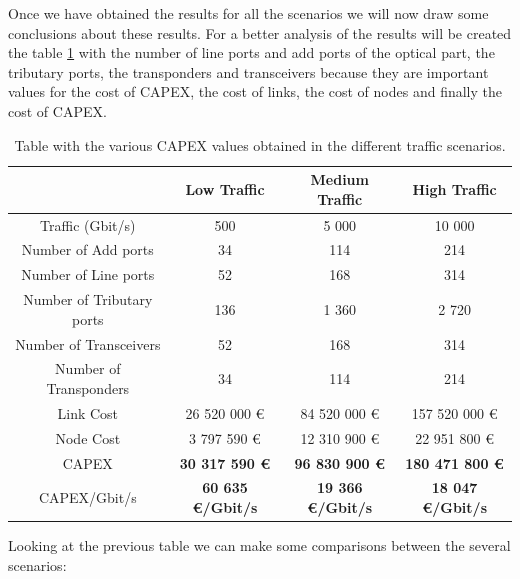 Once we have obtained the results for all the scenarios we will now draw some conclusions about these results. For a better analysis of the results will be created the table \ref{table_comparative_transp_surv} with the number of line ports and add ports of the optical part, the tributary ports, the transponders and transceivers because they are important values for the cost of CAPEX, the cost of links, the cost of nodes and finally the cost of CAPEX.\\

\begin{table}[h!]
\centering
\begin{tabular}{| c | c | c | c |}
 \hline
  & Low Traffic & Medium Traffic  & High Traffic \\
 \hline\hline
 Traffic (Gbit/s) & 500 & 5 000 & 10 000 \\ \hline
 Number of Add ports & 34 & 114 & 214 \\ \hline
 Number of Line ports & 52 & 168 & 314 \\ \hline
 Number of Tributary ports & 136 & 1 360 & 2 720 \\ \hline
 Number of Transceivers & 52 & 168 & 314 \\ \hline
 Number of Transponders & 34 & 114 & 214 \\ \hline
 Link Cost & 26 520 000 \euro & 84 520 000 \euro & 157 520 000 \euro \\ \hline
 Node Cost & 3 797 590 \euro & 12 310 900 \euro & 22 951 800 \euro \\ \hline
 CAPEX & \textbf{30 317 590 \euro} & \textbf{96 830 900 \euro} & \textbf{180 471 800 \euro} \\ \hline
 CAPEX/Gbit/s & \textbf{60 635 \euro/Gbit/s} & \textbf{19 366 \euro/Gbit/s} & \textbf{18 047 \euro/Gbit/s}\\
 \hline
\end{tabular}
\caption{Table with the various CAPEX values obtained in the different traffic scenarios.}
\label{table_comparative_transp_surv}
\end{table}

Looking at the previous table we can make some comparisons between the several scenarios:

